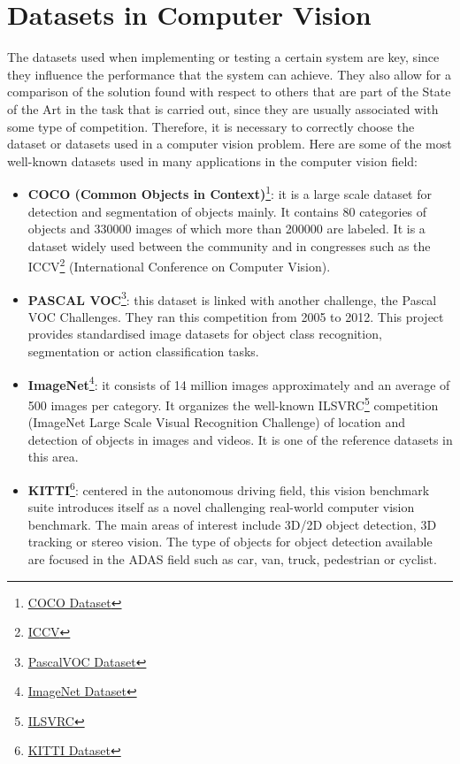 \section{Datasets in Computer Vision}
The datasets used when implementing or testing a certain system are key, since they influence the performance that the system can achieve. They also allow for a comparison of the solution found with respect to others that are part of the State of the Art in the task that is carried out, since they are usually associated with some type of competition. Therefore, it is necessary to correctly choose the dataset or datasets used in a computer vision problem. Here are some of the most well-known datasets used in many applications in the computer vision field:
\begin{itemize}
\item \textbf{COCO (Common Objects in Context)}\footnote{\href{http://cocodataset.org/#home}{COCO Dataset}}: it is a large scale dataset for detection and segmentation of objects mainly. It contains 80 categories of objects and 330000 images of which more than 200000 are labeled. It is a dataset widely used between the community and in congresses such as the ICCV\footnote{\href{http://iccv2019.thecvf.com/}{ICCV}} (International Conference on Computer Vision).
\item \textbf{PASCAL VOC}\footnote {\href{http://host.robots.ox.ac.uk/pascal/VOC/}{PascalVOC Dataset}}: this dataset is linked with another challenge, the Pascal VOC Challenges. They ran this competition from 2005 to 2012. This project provides standardised image datasets for object class recognition, segmentation or action classification tasks.
\item \textbf{ImageNet}\footnote {\href{http://www.image-net.org/}{ImageNet Dataset}}: it consists of 14 million images approximately and an average of 500 images per category. It organizes the well-known ILSVRC\footnote{\href{http://image-net.org/challenges/LSVRC/}{ILSVRC}} competition (ImageNet Large Scale Visual Recognition Challenge) of location and detection of objects in images and videos. It is one of the reference datasets in this area.
\item \textbf{KITTI}\footnote {\href{http://www.cvlibs.net/datasets/kitti/}{KITTI Dataset}}: centered in the autonomous driving field, this vision benchmark suite introduces itself as a novel challenging real-world computer vision benchmark. The main areas of interest include 3D/2D object detection, 3D tracking or stereo vision. The type of objects for object detection available are focused in the ADAS field such as car, van, truck, pedestrian or cyclist.

\end{itemize}
